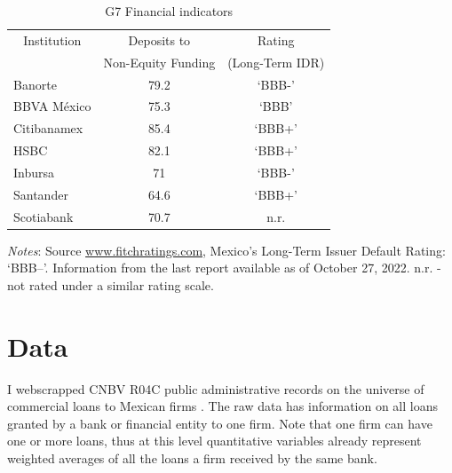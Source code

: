 \documentclass[11pt, oneside]{book}
\begin{document}
\begin{table}[htbp]
\centering
\captionsetup{font=footnotesize}
  \begin{threeparttable}
  \caption{G7 Financial indicators}
\label{Table_G7}
\begin{tabular}{@{}lcc@{}}
\toprule
\multicolumn{1}{c}{Institution} & Deposits to & Rating  \\ 
\multicolumn{1}{c}{ } & Non-Equity Funding &(Long-Term IDR) \\
\midrule
Banorte                                     & 79.2       & `BBB-'                            \\
BBVA México                                 & 75.3       & `BBB'                             \\
Citibanamex                                 & 85.4       & `BBB+'                            \\
HSBC                                        & 82.1       & `BBB+'                            \\
Inbursa                                     & 71         & `BBB-'                            \\
Santander                                   & 64.6       & `BBB+'                            \\
Scotiabank                                  & 70.7       & n.r.                            \\
\bottomrule
\end{tabular}
\begin{tablenotes}
	\small
      \item \textit{Notes}:  Source \url{www.fitchratings.com}, Mexico's Long-Term Issuer Default Rating: `BBB–'. Information from the last report available as of October 27, 2022. n.r. - not rated under a similar rating scale.
    \end{tablenotes}
\end{threeparttable}
\end{table}


\chapter{Data} \label{sect4}
I webscrapped CNBV R04C public administrative records on the universe of commercial loans to Mexican firms \citep{CNBV2022portafolio}. The raw data has information on all loans granted by a bank or financial entity to one firm. Note that one firm can have one or more loans, thus at this level quantitative variables already represent weighted averages of all the loans a firm received by the same bank.
\end{document}
